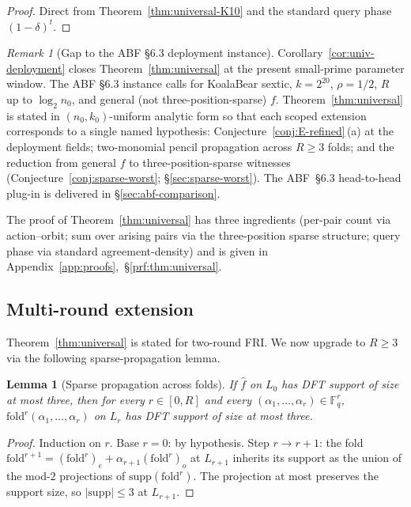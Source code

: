 \documentclass[11pt]{article}
\newtheorem{lemma}[theorem]{Lemma}
\theoremstyle{definition}
\theoremstyle{remark}
\newtheorem{remark}[theorem]{Remark}
\newcommand{\FF}{\mathbb{F}}
\begin{document}
\begin{proof}
Direct from Theorem~\ref{thm:universal-K10} and the standard query
phase $(1-\delta)^t$.
\end{proof}

\begin{remark}[Gap to the ABF \S 6.3 deployment instance]
\label{rem:cor-deployment-gap}
Corollary~\ref{cor:univ-deployment} closes Theorem~\ref{thm:universal}
at the present small-prime parameter window. The ABF \S 6.3 instance
calls for KoalaBear sextic, $k = 2^{20}$, $\rho = 1/2$, $R$ up to
$\log_2 n_0$, and general (not three-position-sparse) $f$.
Theorem~\ref{thm:universal} is stated in $(n_0, k_0)$-uniform analytic
form so that each scoped extension corresponds to a single named
hypothesis: Conjecture~\ref{conj:E-refined}\,(a) at the deployment
fields; two-monomial pencil propagation across $R \geq 3$ folds; and
the reduction from general $f$ to three-position-sparse witnesses
(Conjecture~\ref{conj:sparse-worst}; \S\ref{sec:sparse-worst}). The
ABF~\S 6.3 head-to-head plug-in is delivered in
\S\ref{sec:abf-comparison}.
\end{remark}

The proof of Theorem~\ref{thm:universal} has three ingredients
(per-pair count via action--orbit; sum over arising pairs via the
three-position sparse structure; query phase via standard
agreement-density) and is given in
Appendix~\ref{app:proofs},~\S\ref{prf:thm:universal}.

\subsection{Multi-round extension}
\label{ssec:multiround}
Theorem~\ref{thm:universal} is stated for two-round FRI. We now upgrade
to $R \geq 3$ via the following sparse-propagation lemma.

\begin{lemma}[Sparse propagation across folds]
\label{lem:sparse-propagation}
If $\hat f$ on $L_0$ has DFT support of size at most three, then for
every $r \in [0, R]$ and every $(\alpha_1, \dots, \alpha_r) \in \FF_q^r$,
$\mathrm{fold}^r(\alpha_1, \dots, \alpha_r)$ on $L_r$ has DFT support of
size at most three.
\end{lemma}

\begin{proof}
Induction on $r$. Base $r = 0$: by hypothesis. Step $r \to r+1$: the
fold $\mathrm{fold}^{r+1} = (\mathrm{fold}^r)_e + \alpha_{r+1}
(\mathrm{fold}^r)_o$ at $L_{r+1}$ inherits its support as the union of
the mod-$2$ projections of $\mathrm{supp}(\mathrm{fold}^r)$. The
projection at most preserves the support size, so $|\mathrm{supp}|
\leq 3$ at $L_{r+1}$.
\end{proof}
\end{document}
